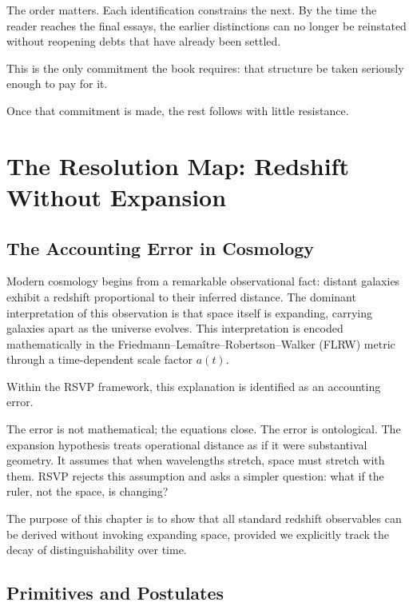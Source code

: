\documentclass[11pt]{book}
\begin{document}
The order matters. Each identification constrains the next. By the time the reader reaches the final essays, the earlier distinctions can no longer be reinstated without reopening debts that have already been settled.

This is the only commitment the book requires: that structure be taken seriously enough to pay for it.

Once that commitment is made, the rest follows with little resistance.

\mainmatter


\chapter{The Resolution Map: Redshift Without Expansion}

\section{The Accounting Error in Cosmology}

Modern cosmology begins from a remarkable observational fact: distant galaxies exhibit a redshift proportional to their inferred distance. The dominant interpretation of this observation is that space itself is expanding, carrying galaxies apart as the universe evolves. This interpretation is encoded mathematically in the Friedmann--Lemaître--Robertson--Walker (FLRW) metric through a time-dependent scale factor \(a(t)\).

Within the RSVP framework, this explanation is identified as an accounting error.

The error is not mathematical; the equations close. The error is ontological. The expansion hypothesis treats operational distance as if it were substantival geometry. It assumes that when wavelengths stretch, space must stretch with them. RSVP rejects this assumption and asks a simpler question: what if the ruler, not the space, is changing?

The purpose of this chapter is to show that all standard redshift observables can be derived without invoking expanding space, provided we explicitly track the decay of distinguishability over time.

\section{Primitives and Postulates}
\end{document}
